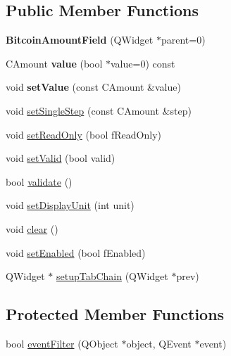 \subsection*{Public Member Functions}
\begin{DoxyCompactItemize}
\item 
\mbox{\label{class_bitcoin_amount_field_a94510575103488c6f2319aada366aca5}} 
{\bfseries Bitcoin\+Amount\+Field} (Q\+Widget $\ast$parent=0)
\item 
\mbox{\label{class_bitcoin_amount_field_a2d9051926a2eb1ca799408a545622420}} 
C\+Amount {\bfseries value} (bool $\ast$value=0) const
\item 
\mbox{\label{class_bitcoin_amount_field_ad34b8770f7acfc23be8a8780ad8742fe}} 
void {\bfseries set\+Value} (const C\+Amount \&value)
\item 
void \mbox{\hyperlink{class_bitcoin_amount_field_a26ff92c23985e9ed79870311aed298c3}{set\+Single\+Step}} (const C\+Amount \&step)
\item 
void \mbox{\hyperlink{class_bitcoin_amount_field_a3762c335f161796bb2ea3208d9ec2efd}{set\+Read\+Only}} (bool f\+Read\+Only)
\item 
void \mbox{\hyperlink{class_bitcoin_amount_field_ac4ca86e405804bad9689d74160e962de}{set\+Valid}} (bool valid)
\item 
bool \mbox{\hyperlink{class_bitcoin_amount_field_a87e6f2d15150baf5962acf7d7151610d}{validate}} ()
\item 
void \mbox{\hyperlink{class_bitcoin_amount_field_a623534b2ad508278c5fa8f4c7f363804}{set\+Display\+Unit}} (int unit)
\item 
void \mbox{\hyperlink{class_bitcoin_amount_field_a66fb8e84968302c0a1b1914338ff8001}{clear}} ()
\item 
void \mbox{\hyperlink{class_bitcoin_amount_field_a0f1bab2b81d298bdc7a3a8c612dbceaa}{set\+Enabled}} (bool f\+Enabled)
\item 
Q\+Widget $\ast$ \mbox{\hyperlink{class_bitcoin_amount_field_aa48f6950f46333c9e781880ecc279408}{setup\+Tab\+Chain}} (Q\+Widget $\ast$prev)
\end{DoxyCompactItemize}
\subsection*{Protected Member Functions}
\begin{DoxyCompactItemize}
\item 
bool \mbox{\hyperlink{class_bitcoin_amount_field_acc04caa1dfdc0c007ec978fb05ac9061}{event\+Filter}} (Q\+Object $\ast$object, Q\+Event $\ast$event)
\end{DoxyCompactItemize}
